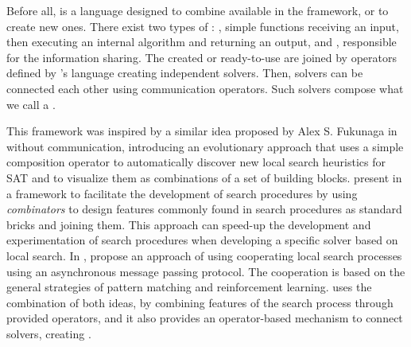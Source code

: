 Before all, \posl{} is a language designed to combine \ms{} available in the framework, or to create new ones. There exist two types of \ms{}: \oms{}, simple functions receiving an input, then executing an internal algorithm and returning an output, and \opchs{}, responsible for the information sharing.
The created or ready-to-use \ms{} are joined by operators defined by \posl's language creating independent solvers. Then, solvers can be connected each other using communication operators. Such solvers compose what we call a \soset. %


This framework was inspired by a similar idea proposed by Alex S. Fukunaga in \cite{Fukunaga2008} without communication, introducing an evolutionary approach that uses a simple composition operator to automatically discover new local search heuristics for SAT and to  visualize them as combinations of a set of building blocks.  present in \cite{Landtsheer2015} a framework to facilitate the development of search procedures by using \textit{combinators} to design features commonly found in search procedures as standard bricks and joining them. This approach can speed-up the development and experimentation of search procedures when developing a specific solver based on local search. In \cite{Martin2016},  propose an approach of using cooperating local search processes using an asynchronous message passing protocol. The cooperation is based on the general strategies of pattern matching and reinforcement learning. \posl{} uses the combination of both ideas, by combining features of the search process through provided operators, and it also provides an operator-based mechanism to connect solvers, creating \comstrs.



